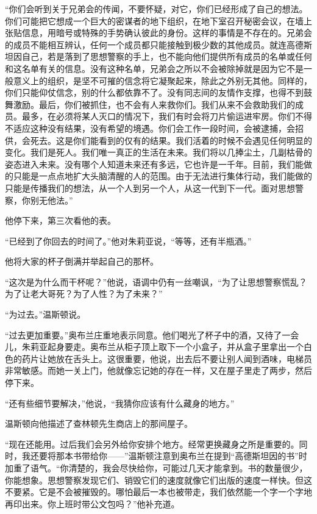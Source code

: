``你们会听到关于兄弟会的传闻，不要怀疑，对它，你们已经形成了自己的想法。你们可能把它想成一个巨大的密谋者的地下组织，在地下室召开秘密会议，在墙上张贴信息，用暗号或特殊的手势确认彼此的身份。这样的事情是不存在的。兄弟会的成员不能相互辨认，任何一个成员都只能接触到极少数的其他成员。就连高德斯坦因自己，若是落到了思想警察的手上，也不能向他们提供所有成员的名单或任何和这名单有关的信息。没有这种名单，兄弟会之所以不会被除掉就是因为它不是一般意义上的组织，是坚不可摧的信念将它凝聚起来，除此之外别无其他。同样的，你们只能仰仗信念，别的什么都依靠不了。没有同志间的友情作支撑，也得不到鼓舞激励。最后，你们被抓住，也不会有人来救你们。我们从来不会救助我们的成员。最多，在必须将某人灭口的情况下，我们有时会将刀片偷运进牢房。你们不得不适应这种没有结果，没有希望的境遇。你们会工作一段时间，会被逮捕，会招供，会死去。这是你们能看到的仅有的结果。我们活着的时候不会遇见任何明显的变化。我们是死人。我们唯一真正的生活在未来。我们将以几捧尘土，几副枯骨的姿态进入未来。没有哪个人知道未来还有多远，它也许是一千年。目前，我们能做的只能是一点点地扩大头脑清醒的人的范围。由于无法进行集体行动，我们能做的只能是传播我们的想法，从一个人到另一个人，从这一代到下一代。面对思想警察，你别无他法。''

他停下来，第三次看他的表。

``已经到了你回去的时间了。''他对朱莉亚说，``等等，还有半瓶酒。''

他将大家的杯子倒满并举起自己的那杯。

``这次是为什么而干杯呢？''他说，语调中仍有一丝嘲讽，``为了让思想警察慌乱？为了让老大哥死？为了人性？为了未来？''

``为过去。''温斯顿说。

``过去更加重要。''奥布兰庄重地表示同意。他们喝光了杯子中的酒，又待了一会儿，朱莉亚起身要走。奥布兰从柜子顶上取下一个小盒子，并从盒子里拿出一个白色的药片让她放在舌头上。这很重要，他说，出去后不要让别人闻到酒味，电梯员非常敏感。而她一关上门，他就像忘记她的存在一样，又在屋子里走了两步，然后停下来。

``还有些细节要解决，''他说，``我猜你应该有什么藏身的地方。''

温斯顿向他描述了查林顿先生商店上的那间屋子。

``现在还能用。过后我们会另外给你安排个地方。经常更换藏身之所是重要的。同时，我还要将那本书带给你——''温斯顿注意到奥布兰在提到``高德斯坦因的书''时加重了语气。``你清楚的，我会尽快给你，可能过几天才能拿到。书的数量很少，你能想象。思想警察发现它们、销毁它们的速度就像它们出版的速度一样快。但这不要紧。它是不会被摧毁的。哪怕最后一本也被带走，我们依然能一个字一个字地再印出来。你上班时带公文包吗？''他补充道。

